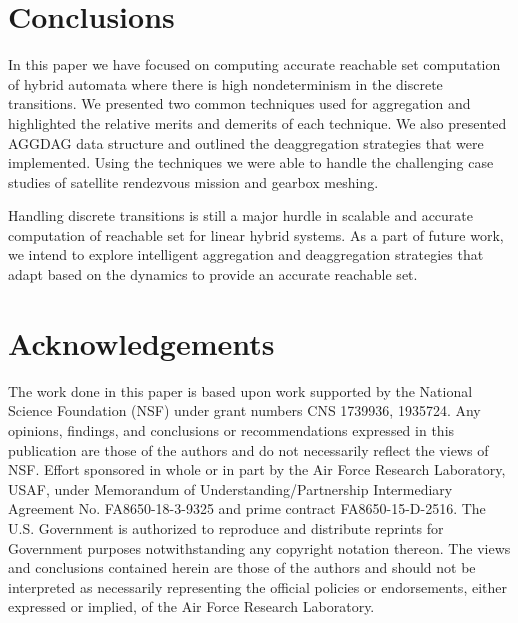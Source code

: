 \documentclass[acmsmall]{acmart}
\begin{document}


\maketitle

%
%
%






\section{Conclusions}
In this paper we have focused on computing accurate reachable set computation of hybrid automata where there is high nondeterminism in the discrete transitions. We presented two common techniques used for aggregation and highlighted the relative merits and demerits of each technique. We also presented AGGDAG data structure and outlined the deaggregation strategies that were implemented. Using the techniques we were able to handle the challenging case studies of satellite rendezvous mission and gearbox meshing.

Handling discrete transitions is still a major hurdle in scalable and accurate computation of reachable set for linear hybrid systems. As a part of future work, we intend to explore intelligent aggregation and deaggregation strategies that adapt based on the dynamics to provide an accurate reachable set.

\section*{Acknowledgements} The work done in this paper is based upon work supported by the National Science Foundation (NSF) under grant numbers CNS 1739936, 1935724. Any opinions, findings, and conclusions or recommendations expressed in this publication are those of the authors and do not necessarily reflect the views of NSF.
%
Effort sponsored in whole or in part by the Air Force Research Laboratory, USAF, under Memorandum of Understanding/Partnership Intermediary Agreement No. 
FA8650-18-3-9325 and prime contract FA8650-15-D-2516.  The U.S. Government is authorized to reproduce and distribute reprints for Government purposes notwithstanding any copyright notation thereon. The views and conclusions contained herein are those of the authors and should not be interpreted as necessarily representing the official policies or endorsements, either expressed or implied, of the Air Force Research Laboratory.


\vspace{-0.2cm}


\end{document}
